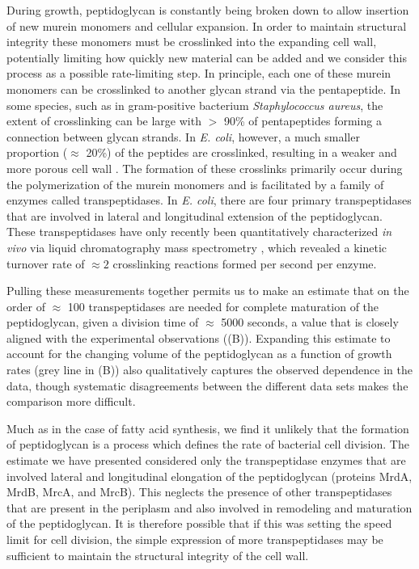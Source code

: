 During growth, peptidoglycan is constantly being broken down to allow insertion
of new murein monomers and cellular expansion. In order to maintain structural
integrity these monomers must be crosslinked into the expanding cell wall,
potentially limiting how quickly new material can be added and we consider this
process as a possible rate-limiting step. In principle,  each one of these
murein monomers can be crosslinked to another glycan strand via the
pentapeptide.  In some species, such as in gram-positive bacterium
\textit{Staphylococcus aureus}, the extent of crosslinking can be large with $>$
90\% of pentapeptides forming a connection between glycan strands. In \textit{E.
coli}, however, a much smaller proportion ($\approx$ 20\%) of the peptides are
crosslinked, resulting in a weaker and more porous cell wall \cite{vollmer2008a,
rogers1980}.  The formation of these crosslinks primarily occur during the
polymerization of the murein monomers and is facilitated by a family of enzymes
called transpeptidases. In \textit{E. coli}, there are four primary
transpeptidases that are involved in lateral and longitudinal extension of the
peptidoglycan. These transpeptidases have only recently been quantitatively
characterized \textit{in vivo} via liquid chromatography mass spectrometry
\citep{catherwood2020}, which revealed a kinetic turnover rate of $\approx
2$ crosslinking reactions formed per second per enzyme.

Pulling these measurements together permits us to make an estimate that on the
order of $\approx$ 100 transpeptidases are needed for complete maturation of the
peptidoglycan, given a division time of $\approx$ 5000 seconds, a value that is
closely aligned with the experimental observations ((B)).
Expanding this estimate to account for the changing volume of the peptidoglycan
as a function of growth rates (grey line in (B)) also
qualitatively captures the observed dependence in the data, though systematic
disagreements between the different data sets makes the comparison more
difficult.

Much as in the case of fatty acid synthesis, we find it unlikely that the
formation of peptidoglycan is a process which defines the rate of bacterial cell division.
The estimate we have presented considered only the transpeptidase enzymes that
are involved lateral and longitudinal elongation of the peptidoglycan (proteins
MrdA, MrdB, MrcA, and MrcB). This neglects the presence of other transpeptidases
that are present in the periplasm and also involved in remodeling and maturation
of the peptidoglycan. It is therefore possible that if this was setting the
speed limit for cell division, the simple expression of more
transpeptidases may be sufficient to maintain the structural integrity of the
cell wall.


